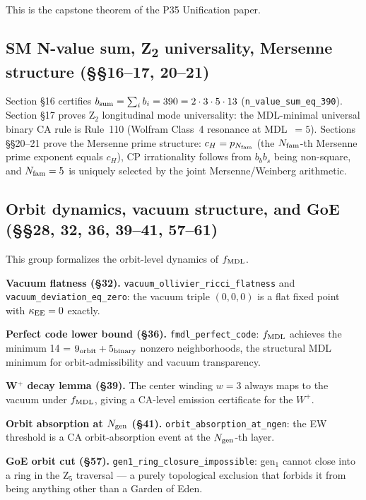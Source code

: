 \documentclass[11pt,a4paper]{article}
\theoremstyle{definition}
\begin{document}
This is the capstone theorem of the P35 Unification paper.

\subsection{SM N-value sum, Z\textsubscript{2} universality, Mersenne structure (§§16--17, 20--21)}\label{subsec:gut-z2}

Section §16 certifies $b_{\rm sum} = \sum_i b_i = 390 = 2 \cdot 3 \cdot 5 \cdot 13$
(\lstinline|n_value_sum_eq_390|).  Section §17 proves Z$_2$ longitudinal mode
universality: the MDL-minimal universal binary CA rule is Rule~110 (Wolfram Class~4
resonance at MDL~$=5$).  Sections §§20--21 prove the Mersenne prime structure:
$c_H = p_{N_{\rm fam}}$ (the $N_{\rm fam}$-th Mersenne prime exponent equals $c_H$),
CP irrationality follows from $b_b b_s$ being non-square, and $N_{\rm fam}=5$ is
uniquely selected by the joint Mersenne/Weinberg arithmetic.

\subsection{Orbit dynamics, vacuum structure, and GoE (§§28, 32, 36, 39--41, 57--61)}\label{subsec:gut-orbit}

This group formalizes the orbit-level dynamics of $f_{\rm MDL}$.

\textbf{Vacuum flatness (§32).}  \lstinline|vacuum_ollivier_ricci_flatness| and
\lstinline|vacuum_deviation_eq_zero|: the vacuum triple $(0,0,0)$ is a flat fixed point
with $\kappa_{\rm EE}=0$ exactly.

\textbf{Perfect code lower bound (§36).}  \lstinline|fmdl_perfect_code|:
$f_{\rm MDL}$ achieves the minimum 14 = $9_{\rm orbit} + 5_{\rm binary}$ nonzero
neighborhoods, the structural MDL minimum for orbit-admissibility and vacuum transparency.

\textbf{W$^+$ decay lemma (§39).}  The center winding $w=3$ always maps to the vacuum
under $f_{\rm MDL}$, giving a CA-level emission certificate for the $W^+$.

\textbf{Orbit absorption at $N_{\rm gen}$ (§41).}  \lstinline|orbit_absorption_at_ngen|:
the EW threshold is a CA orbit-absorption event at the $N_{\rm gen}$-th layer.

\textbf{GoE orbit cut (§57).}  \lstinline|gen1_ring_closure_impossible|: gen$_1$ cannot
close into a ring in the Z$_5$ traversal — a purely topological exclusion that forbids
it from being anything other than a Garden of Eden.
\end{document}
